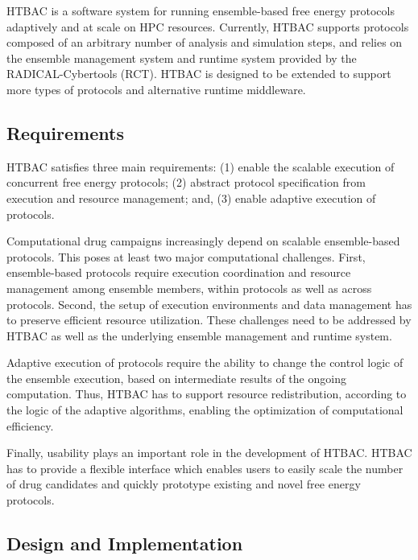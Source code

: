 HTBAC is a software system for running ensemble-based free energy protocols
adaptively and at scale on HPC resources. Currently, HTBAC supports protocols
composed of an arbitrary number of analysis and simulation steps, and relies
on the ensemble management system and runtime system provided by the
RADICAL-Cybertools (RCT). HTBAC is designed to be extended to support more
types of protocols and alternative runtime middleware.

\subsection{Requirements}

HTBAC satisfies three main requirements: (1) enable the scalable execution of
concurrent free energy protocols; (2) abstract protocol specification from
execution and resource management; and, (3) enable adaptive execution of
protocols.

Computational drug campaigns increasingly depend on scalable ensemble-based
protocols. This poses at least two major computational challenges. First,
ensemble-based protocols require execution coordination and resource
management among ensemble members, within protocols as well as across
protocols. Second, the setup of execution environments and data management
has to preserve efficient resource utilization. These challenges need to be
addressed by HTBAC as well as the underlying ensemble management and runtime
system.

Adaptive execution of protocols require the ability to change the control
logic of the ensemble execution, based on intermediate results of the ongoing
computation. Thus, HTBAC has to support resource redistribution, according to
the logic of the adaptive algorithms, enabling the optimization of
computational efficiency.

Finally, usability plays an important role in the development of HTBAC. HTBAC
has to provide a flexible interface which enables users to easily scale the
number of drug candidates and quickly prototype existing and novel free
energy protocols.

\subsection{Design and Implementation}\label{ssec:design_arch}

